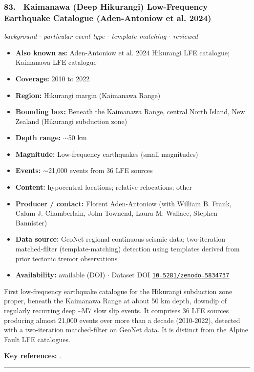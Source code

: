 \documentclass[10pt,a4paper]{article}
\newcommand{\catentryrule}{\par\vspace{3pt}\noindent\textcolor{rulegrey}{\rule{\linewidth}{0.3pt}}\par\vspace{5pt}}
\newcommand{\kv}[2]{\item \textbf{#1:} #2}
\begin{document}
\subsubsection*{\hypertarget{c:83}{83.}~ Kaimanawa (Deep Hikurangi) Low-Frequency Earthquake Catalogue (Aden-Antoniow et al. 2024)}
{\small\itshape background $\cdot$ particular-event-type $\cdot$ template-matching $\cdot$ reviewed}\par\vspace{2pt}
\begin{itemize}[leftmargin=1.3em,itemsep=0.6pt,topsep=1pt,parsep=0pt]
\kv{Also known as}{Aden-Antoniow et al. 2024 Hikurangi LFE catalogue; Kaimanawa LFE catalogue}
\kv{Coverage}{2010 to 2022}
\kv{Region}{Hikurangi margin (Kaimanawa Range)}
\kv{Bounding box}{Beneath the Kaimanawa Range, central North Island, New Zealand (Hikurangi subduction zone)}
\kv{Depth range}{$\sim$50 km}
\kv{Magnitude}{Low-frequency earthquakes (small magnitudes)}
\kv{Events}{$\sim$21,000 events from 36 LFE sources}
\kv{Content}{hypocentral locations; relative relocations; other}
\kv{Producer / contact}{Florent Aden-Antoniow (with William B. Frank, Calum J. Chamberlain, John Townend, Laura M. Wallace, Stephen Bannister)}
\kv{Data source}{GeoNet regional continuous seismic data; two-iteration matched-filter (template-matching) detection using templates derived from prior tectonic tremor observations}
\kv{Availability}{available (DOI) $\cdot$ Dataset DOI \href{https://doi.org/10.5281/zenodo.5834737}{\nolinkurl{10.5281/zenodo.5834737}}}
\end{itemize}
\par\vspace{2pt}First low-frequency earthquake catalogue for the Hikurangi subduction zone proper, beneath the Kaimanawa Range at about 50 km depth, downdip of regularly recurring deep \textasciitilde{}M7 slow slip events. It comprises 36 LFE sources producing almost 21,000 events over more than a decade (2010-2022), detected with a two-iteration matched-filter on GeoNet data. It is distinct from the Alpine Fault LFE catalogues.
\par\vspace{2pt}\textbf{Key references:} \cite{AdenAntoniow2024}.
\catentryrule
\end{document}
